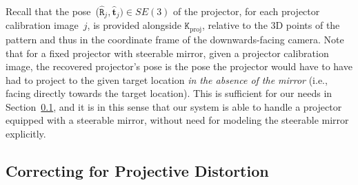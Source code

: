 \documentclass[review]{elsarticle}
\begin{document}
Recall that the pose~($\hat{\mathtt{R}}_j, \hat{\mathbf{t}}_j) \in SE(3)$ of the projector, for each projector calibration image~$j$, is provided alongside $\mathtt{K}_\text{proj}$, relative to the 3D points of the pattern and thus in the coordinate frame of the downwards-facing camera. Note that for a fixed projector with steerable mirror, given a projector calibration image, the recovered projector's pose is the pose the projector would have to have had to project to the given target location \textit{in the absence of the mirror} (i.e., facing directly towards the target location). This is sufficient for our needs in Section~\ref{sec:approach:homography}, and it is in this sense that our system is able to handle a projector equipped with a steerable mirror, without need for modeling the steerable mirror explicitly.


\subsection{Correcting for Projective Distortion}\label{sec:approach:homography}
\end{document}
